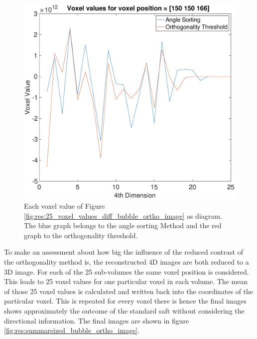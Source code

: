 \begin{figure}[H]
    \centering
    \includegraphics[width=0.7\linewidth]{Graphics/Results/Diff_angle_sort_orthogonality/diff_ortho_bubble_voxelvalues_150150166_sort.eps}
    \caption{Each voxel value of Figure \ref{fig:res:25_voxel_values_diff_bubble_ortho_image} as diagram. The blue graph belongs to the angle sorting Method and the red graph to the orthogonality threshold. }
    \label{fig:Voxel_value_25}
\end{figure}


To make an assessment about how big the influence of the reduced contrast of the orthogonality method is, the reconstructed 4D images are both reduced to a 3D image. For each of the 25 sub-volumes the same voxel position is considered. This leads to 25 voxel values for one particular voxel in each volume. The mean of those 25 voxel values is calculated and written back into the coordinates of the particular voxel. This is repeated for every voxel there is hence the final images shows approximately the outcome of the standard \ac{saft} without considering the directional information. The final images are shown in figure \ref{fig:res:summareized_bubble_ortho_image}.





